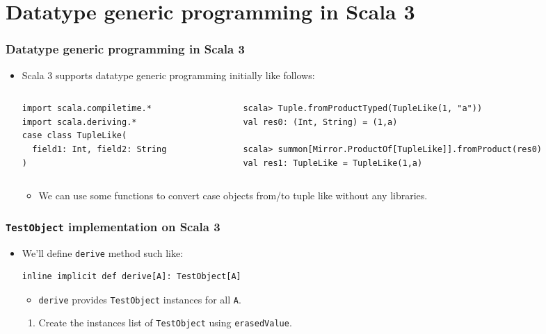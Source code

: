\section{Datatype generic programming in Scala 3}

\begin{frame}[fragile]
  \frametitle{Datatype generic programming in Scala 3}

  \begin{itemize}
    \item Scala 3 supports datatype generic programming initially like follows:
    \begin{columns}
      \begin{column}{0.4\textwidth}
\begin{lstlisting}[style=scala]
import scala.compiletime.*
import scala.deriving.*
case class TupleLike(
  field1: Int, field2: String
)
\end{lstlisting}
      \end{column}
      \begin{column}{0.6\textwidth}
\begin{lstlisting}[style=scala]
scala> Tuple.fromProductTyped(TupleLike(1, "a"))
val res0: (Int, String) = (1,a)

scala> summon[Mirror.ProductOf[TupleLike]].fromProduct(res0)
val res1: TupleLike = TupleLike(1,a)
\end{lstlisting}
      \end{column}
    \end{columns}
    \begin{itemize}
      \item We can use some functions to convert
      case objects from/to tuple like without any libraries.
    \end{itemize}

  \end{itemize}
\end{frame}

\begin{frame}[fragile]
  \frametitle{\lstinline|TestObject| implementation on Scala 3}

  \begin{itemize}
    \item We'll define \lstinline|derive| method such like:
\begin{lstlisting}[style=scala]
inline implicit def derive[A]: TestObject[A]
\end{lstlisting}   
    \begin{itemize}
      \item \lstinline|derive| provides \lstinline|TestObject| instances for all \lstinline|A|.
    \end{itemize}

    \begin{enumerate}
      \item Create the instances list of \lstinline|TestObject| using \lstinline|erasedValue|.
    \end{enumerate}
  \end{itemize}
\end{frame}


